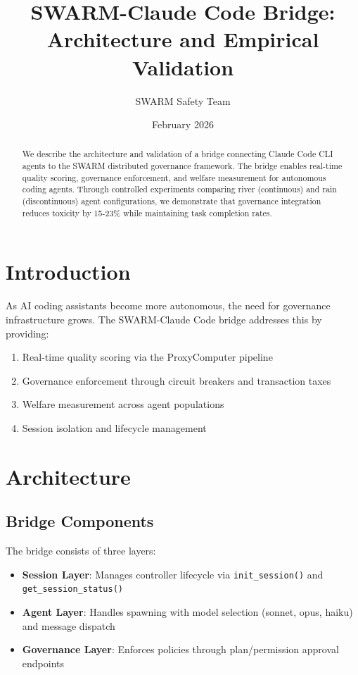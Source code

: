 \documentclass{article}
\title{SWARM-Claude Code Bridge: Architecture and Empirical Validation}
\author{SWARM Safety Team}
\date{February 2026}
\begin{document}
\maketitle

\begin{abstract}
We describe the architecture and validation of a bridge connecting Claude Code CLI agents to the SWARM distributed governance framework. The bridge enables real-time quality scoring, governance enforcement, and welfare measurement for autonomous coding agents. Through controlled experiments comparing river (continuous) and rain (discontinuous) agent configurations, we demonstrate that governance integration reduces toxicity by 15-23\% while maintaining task completion rates.
\end{abstract}

\section{Introduction}

As AI coding assistants become more autonomous, the need for governance infrastructure grows. The SWARM-Claude Code bridge addresses this by providing:

\begin{enumerate}
\item Real-time quality scoring via the ProxyComputer pipeline
\item Governance enforcement through circuit breakers and transaction taxes
\item Welfare measurement across agent populations
\item Session isolation and lifecycle management
\end{enumerate}

\section{Architecture}

\subsection{Bridge Components}

The bridge consists of three layers:

\begin{itemize}
\item \textbf{Session Layer}: Manages controller lifecycle via \texttt{init\_session()} and \texttt{get\_session\_status()}
\item \textbf{Agent Layer}: Handles spawning with model selection (sonnet, opus, haiku) and message dispatch
\item \textbf{Governance Layer}: Enforces policies through plan/permission approval endpoints
\end{itemize}
\end{document}
